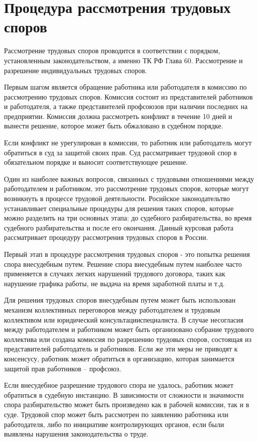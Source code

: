 \section{Процедура рассмотрения трудовых споров }
Рассмотрение трудовых споров проводится в соответствии с порядком, установленным законодательством, а именно ТК РФ Глава 60. Рассмотрение и разрешение индивидуальных трудовых споров.

Первым шагом является обращение работника или работодателя в комиссию по рассмотрению трудовых споров. Комиссия состоит из представителей работников и работодателя, а также представителей профсоюзов при наличии последних на предприятии. Комиссия должна рассмотреть конфликт в течение 10 дней и вынести решение, которое может быть обжаловано в судебном порядке.

Если конфликт не урегулирован в комиссии, то работник или работодатель могут обратиться в суд за защитой своих прав. Суд рассматривает трудовой спор в обязательном порядке и выносит соответствующее решение. 

Один из наиболее важных вопросов, связанных с трудовыми отношениями между работодателем и работником, это рассмотрение трудовых споров, которые могут возникнуть в процессе трудовой деятельности. Росийское законодательтво устанавливает специальные процедуры для решения таких споров, которые можно разделить на три основных этапа: до судебного разбирательства, во время судебного разбирательства и после его окончания. Данный курсовая работа рассматривает процедуру рассмотрения трудовых споров в России.

Первый этап в процедуре рассмотрения трудовых споров - это попытка решения спора внесудебным путем. Решение спора внесудебным путем наиболее часто применяется в случаях легких нарушений трудового договора, таких как нарушение графика работы, не выдача на время заработной платы и т.д.

Для решения трудовых споров внесудебным путем может быть использован механизм коллективных переговоров между работодателем и трудовым коллективом или юридический консультацииспециалиста. В случае несогласия между работодателем и работником может быть организовано собрание трудового коллектива или создана комиссия по разрешению трудовых споров, состоящая из представителей работодатель и работников. Если же эти меры не приводят к консенсусу, работник может обратиться в организацию, которая занимается защитой прав работников – профсоюз.

Если внесудебное разрешение трудового спора не удалось, работник может обратиться в судебную инстанцию. В зависимости от сложности и значимости спора разбирательство может быть произведено как в рабочей комиссии, так и в суде. Трудовой спор может быть рассмотрен по заявлению работника или работодателя, либо по инициативе контролирующих органов, если были выявлены нарушения законодательства о труде.

